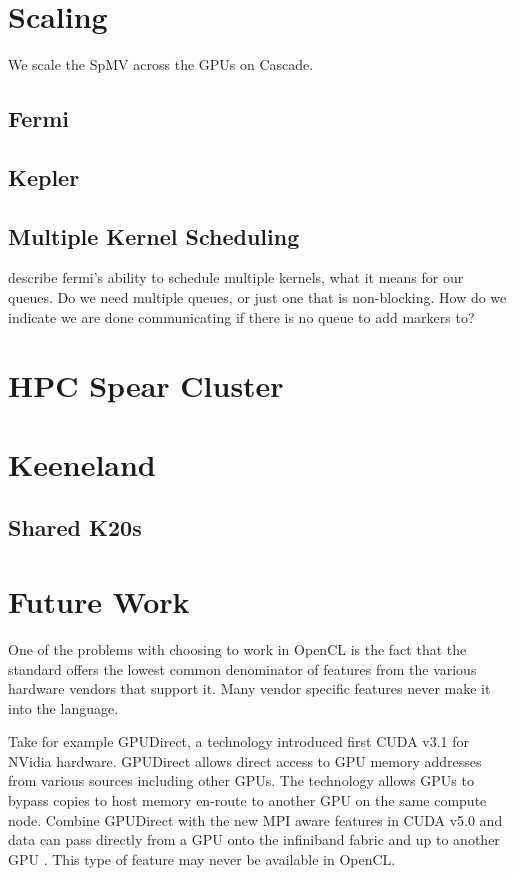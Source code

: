 \documentclass{report}
\begin{document}
\section{Scaling}
We scale the SpMV across the GPUs on Cascade.

\subsection{Fermi}
\subsection{Kepler}
\subsection{Multiple Kernel Scheduling}
describe fermi's ability to schedule multiple kernels, what it means for our queues. Do we need multiple queues, or just one that is non-blocking. How do we indicate we are done communicating if there is no queue to add markers to? 


\section{HPC Spear Cluster} 

\section{Keeneland}

\subsection{Shared K20s}



\section{Future Work}

One of the problems with choosing to work in OpenCL is the fact that the standard offers the lowest common denominator of features from the various hardware vendors that support it. Many vendor specific features never make it into the language. 

Take for example GPUDirect, a technology introduced first CUDA v3.1 for NVidia hardware. GPUDirect allows direct access to GPU memory addresses from various sources including other GPUs. The technology allows GPUs to bypass copies to host memory en-route to another GPU on the same compute node. Combine GPUDirect with the new MPI aware features in CUDA v5.0 and data can pass directly from a GPU onto the infiniband fabric and up to another GPU \cite{NvidiaGPUMPI}. This type of feature may never be available in OpenCL. 




\ifstandalone


\end{document}
